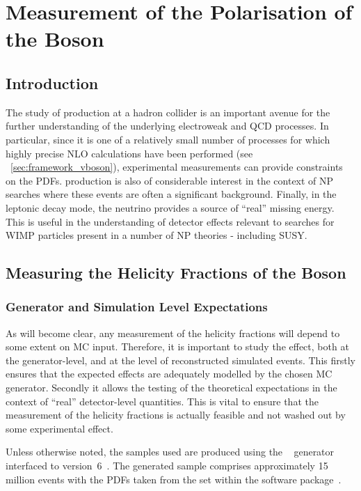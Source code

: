\chapter{Measurement of the Polarisation of the \texorpdfstring{\PW}{W} Boson}
\label{sec:wpol}
\section{Introduction}
The study of \Wjets production at a hadron collider is an important avenue for
the further understanding of the underlying electroweak and \ac{QCD} processes. In
particular, since it is one of a relatively small number of processes for which
highly precise \ac{NLO} calculations have been performed (see
\sec~\ref{sec:framework_vboson}), experimental measurements can provide
constraints on the \acp{PDF}. \Wjets production is also of considerable interest
in the context of \ac{NP} searches where these events are often a significant
background. Finally, in the leptonic decay mode, the neutrino provides a source
of ``real'' missing energy. This is useful in the understanding of detector
effects relevant to searches for \acs{WIMP} particles present in a number of
\ac{NP} theories - including \ac{SUSY}.

\section{Measuring the Helicity Fractions of the \texorpdfstring{\PW}{W} Boson}
\subsection{Generator and Simulation Level Expectations}
As will become clear, any measurement of the helicity fractions will depend to
some extent on \acl{MC} input. Therefore, it is important to study the effect,
both at the generator-level, and at the level of reconstructed simulated
events. This firstly ensures that the expected effects are adequately modelled
by the chosen \ac{MC} generator. Secondly it allows the testing of the
theoretical expectations in the context of ``real'' detector-level
quantities. This is vital to ensure that the measurement of the helicity
fractions is actually feasible and not washed out by some experimental effect.

Unless otherwise noted, the \Wjets samples used are produced using the
\madgraph~\cite{madgraph} generator interfaced to \pythia
version~6~\cite{pythia}. The generated sample comprises approximately 15 million
events with the \acp{PDF} taken from the \cteqsixlone set within the \lhapdf
software package~\cite{lhapdf,lhapdf_web}.

